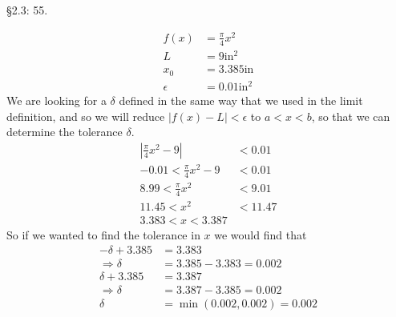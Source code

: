 \documentclass{hwset}
\begin{document}
\begin{problem}[3.]\S 2.3: 55.
\end{problem}

\begin{solution}
	\begin{align*}
		f(x) &= \frac{\pi}{4} x^2 \\
		L &= 9 \text{in}^2 \\
		x_0 &= 3.385 \text{in} \\
		\epsilon &= 0.01 \text{in}^2
	\end{align*}
	We are looking for a $\delta$ defined in the same way that we used in the limit
	definition, and so we will reduce $|f(x) - L| < \epsilon$ to $a < x < b$, so
	that we can determine the tolerance $\delta$.
	\begin{align*}
		\left|\frac{\pi}{4} x^2 - 9\right| &< 0.01 \\
		-0.01 < \frac{\pi}{4} x^2 - 9 &< 0.01 \\
		8.99 < \frac{\pi}{4} x^2 &< 9.01 \\
		11.45 < x^2 &< 11.47 \\
		\boxed{3.383 < x < 3.387}
	\end{align*}
	So if we wanted to find the tolerance in $x$ we would find that 
	\begin{align*}
		-\delta + 3.385 &= 3.383 \\
		\Rightarrow \delta &= 3.385 - 3.383 = 0.002 \\
		\delta + 3.385 &= 3.387 \\
		\Rightarrow \delta &= 3.387 - 3.385 = 0.002 \\ 
		\delta &= \min(0.002, 0.002) = 0.002
	\end{align*}
\end{solution}
\end{document}
